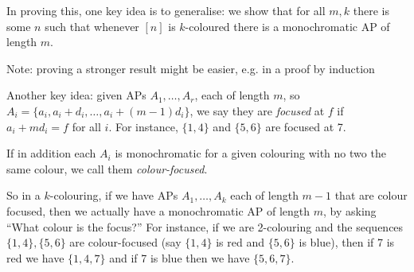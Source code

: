 \documentclass[10pt,a4paper]{article}
\begin{document}
In proving this, one key idea is to generalise: we show that for all $m, k$ there is some $n$ such that whenever $[n]$ is $k$-coloured there is a monochromatic AP of length $m$.

Note: proving a stronger result might be easier, e.g. in a proof by induction

Another key idea: given APs $A_1, \ldots, A_r$, each of length $m$, so $A_i = \{a_i, a_i+d_i, \ldots, a_i+(m-1)d_i\}$, we say they are \emph{focused} at $f$ if $a_i+md_i = f$ for all $i$. For instance, $\{1,4\}$ and $\{5,6\}$ are focused at 7.

If in addition each $A_i$ is monochromatic for a given colouring with no two the same colour, we call them \emph{colour-focused}.

So in a $k$-colouring, if we have APs $A_1, \ldots, A_k$ each of length $m-1$ that are colour focused, then we actually have a monochromatic AP of length $m$, by asking ``What colour is the focus?'' For instance, if we are 2-colouring and the sequences $\{1,4\}, \{5,6\}$ are colour-focused (say $\{1,4\}$ is red and $\{5,6\}$ is blue), then if 7 is red we have $\{1,4,7\}$ and if 7 is blue then we have $\{5,6,7\}$.
\end{document}
